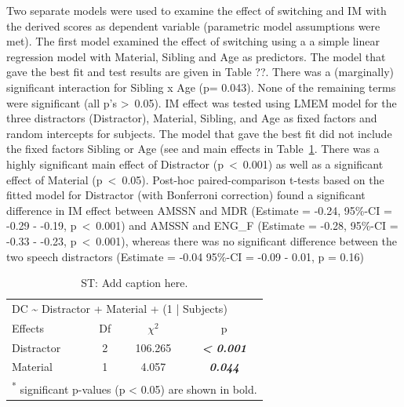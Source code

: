\documentclass[a4paper, twoside]{templates/ociamthesis}
\begin{document}
Two separate models were used to examine the effect of switching and IM with the derived scores as dependent variable (parametric model assumptions were met). The first model examined the effect of switching using a a simple linear regression model with Material, Sibling and Age as predictors. The model that gave the best fit and test results are given in Table ??. There was a (marginally) significant interaction for Sibling x Age (p= 0.043). None of the remaining terms were significant (all p's \textgreater~0.05). IM effect was tested using LMEM model for the three distractors (Distractor), Material, Sibling, and Age as fixed factors and random intercepts for subjects. The model that gave the best fit did not include the fixed factors Sibling or Age (see and main effects in Table~\ref{tab:ST-AgeIMEffTab}. There was a highly significant main effect of Distractor (p~\textless~0.001) as well as a significant effect of Material (p~\textless~0.05). Post-hoc paired-comparison t-tests based on the fitted model for Distractor (with Bonferroni correction) found a significant difference in IM effect between AMSSN and MDR (Estimate = -0.24, 95\%-CI = -0.29 - -0.19, p~\textless~0.001) and AMSSN and ENG\_F (Estimate = -0.28, 95\%-CI = -0.33 - -0.23, p~\textless~0.001), whereas there was no significant difference between the two speech distractors (Estimate = -0.04 95\%-CI = -0.09 - 0.01, p = 0.16)

\begin{table}

\caption{\label{tab:ST-AgeIMEffTab}ST: Add caption here.}
\centering
\begin{tabular}[t]{lcc>{}c}
\toprule
\multicolumn{4}{l}{DC \textasciitilde{} Distractor + Material + (1 | Subjects)} \\
\cmidrule(l{3pt}r{3pt}){1-4}
Effects & Df & $\chi^{2}$ & p\\
\midrule
Distractor & 2 & 106.265 & \em{\textbf{< 0.001}}\\
Material & 1 & 4.057 & \em{\textbf{0.044}}\\
\bottomrule
\multicolumn{4}{l}{\textsuperscript{*} significant p-values (p < 0.05) are shown in bold.}\\
\end{tabular}
\end{table}
\end{document}
